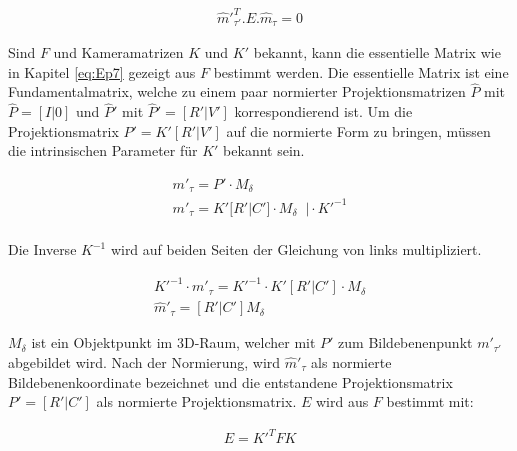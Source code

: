 \begin{gather}
\hat{m}'^T_{\tau'}.E.\hat{m}_\tau = 0 
\end{gather}

Sind $F$ und Kameramatrizen $K$ und $K'$ bekannt, kann die essentielle Matrix wie in Kapitel \ref{eq:Ep7} gezeigt aus $F$ bestimmt werden. Die essentielle Matrix ist eine Fundamentalmatrix, welche zu einem paar normierter Projektionsmatrizen $\hat{P}$ mit $\hat{P} = [I|0]$ und $\hat{P}'$ mit $\hat{P}'= [R'|V']$ korrespondierend ist\cite{HZ,Zhang2014,ZZGXr,Ferid}. Um die Projektionsmatrix $P'=K'[R'|V']$ auf die normierte Form zu bringen, müssen die intrinsischen Parameter für $K'$ bekannt sein\cite{HZ}. 

\begin{gather}
	m'_{\tau} = P' \cdot M_\delta\\
	m'_{\tau} = K'[R'|C'] \cdot M_\delta\;\; | \cdot K'^{-1}\\
	\end{gather}
	
Die Inverse $K^{-1}$ wird auf beiden Seiten der Gleichung von links multipliziert\cite{HZ}.

\begin{gather}
	K'^{-1} \cdot m'_{\tau} = K'^{-1} \cdot K'[R'|C'] \cdot M_\delta\\
	\hat{m}'_{\tau} = [R'|C'] M_\delta
\end{gather}

$M_\delta$ ist ein Objektpunkt im 3D-Raum, welcher mit $P'$ zum Bildebenenpunkt $m'_{\tau'}$ abgebildet wird. Nach der Normierung, wird $\hat{m}'_{\tau}$ als normierte Bildebenenkoordinate bezeichnet und die entstandene Projektionsmatrix $P' = [R'|C']$ als normierte Projektionsmatrix\cite{HZ,Ferid}. $E$ wird aus $F$ bestimmt mit:

\begin{gather}
E = K'^TFK
\end{gather}


